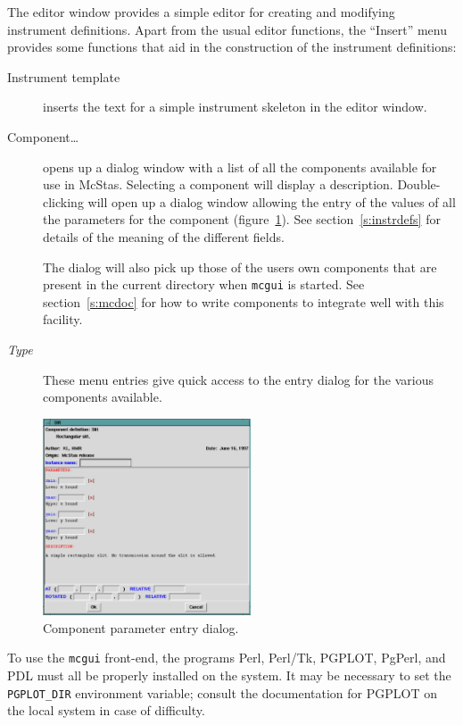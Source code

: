 The editor window provides a simple editor for creating and modifying
instrument definitions. Apart from the usual editor functions, the
``Insert'' menu provides some functions that aid in the construction of
the instrument definitions:
\begin{description}
\item[Instrument template] inserts the text for a simple instrument
  skeleton in the editor window.
\item[Component\ldots] opens up a dialog window with a list of all
  the components available for use in McStas. Selecting a component will
  display a description. Double-clicking will open up a dialog window
  allowing the entry of the values of all the parameters for the
  component (figure~\ref{f:comp_dialog}). See section~\ref{s:instrdefs}
  for details of the meaning of the different fields.

The dialog will also pick up those of the users own components that are
  present in the current directory when \verb+mcgui+ is started. See
  section~\ref{s:mcdoc} for how to write components to integrate well
  with this facility.
\item[\textit{Type}] These menu entries give quick access to the entry
  dialog for the various components available.
\end{description}
\begin{figure}[tbp]
  \begin{center}
    \includegraphics[width=0.55\textwidth]{figures/comp_dialog.eps}
    \caption{Component parameter entry dialog.}
    \label{f:comp_dialog}
  \end{center}
\end{figure}


To use the \verb+mcgui+ front-end, the programs Perl, Perl/Tk, PGPLOT, PgPerl,
and PDL must all be properly installed on the system. It may
be necessary to set the \verb+PGPLOT_DIR+ environment variable; consult
the documentation for PGPLOT on the local system in case of difficulty.


